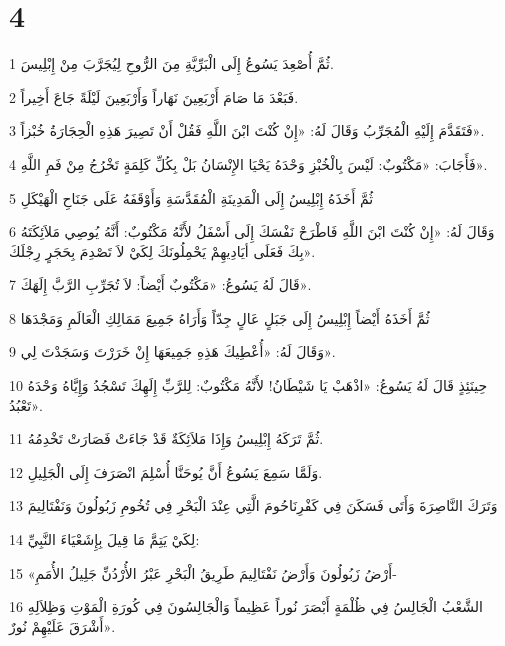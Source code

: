 \chapter{4}

\par 1 ثُمَّ أُصْعِدَ يَسُوعُ إِلَى الْبَرِّيَّةِ مِنَ الرُّوحِ لِيُجَرَّبَ مِنْ إِبْلِيسَ.
\par 2 فَبَعْدَ مَا صَامَ أَرْبَعِينَ نَهَاراً وَأَرْبَعِينَ لَيْلَةً جَاعَ أَخِيراً.
\par 3 فَتَقَدَّمَ إِلَيْهِ الْمُجَرِّبُ وَقَالَ لَهُ: «إِنْ كُنْتَ ابْنَ اللَّهِ فَقُلْ أَنْ تَصِيرَ هَذِهِ الْحِجَارَةُ خُبْزاً».
\par 4 فَأَجَابَ: «مَكْتُوبٌ: لَيْسَ بِالْخُبْزِ وَحْدَهُ يَحْيَا الإِنْسَانُ بَلْ بِكُلِّ كَلِمَةٍ تَخْرُجُ مِنْ فَمِ اللَّهِ».
\par 5 ثُمَّ أَخَذَهُ إِبْلِيسُ إِلَى الْمَدِينَةِ الْمُقَدَّسَةِ وَأَوْقَفَهُ عَلَى جَنَاحِ الْهَيْكَلِ
\par 6 وَقَالَ لَهُ: «إِنْ كُنْتَ ابْنَ اللَّهِ فَاطْرَحْ نَفْسَكَ إِلَى أَسْفَلُ لأَنَّهُ مَكْتُوبٌ: أَنَّهُ يُوصِي مَلاَئِكَتَهُ بِكَ فَعَلَى أيَادِيهِمْ يَحْمِلُونَكَ لِكَيْ لاَ تَصْدِمَ بِحَجَرٍ رِجْلَكَ».
\par 7 قَالَ لَهُ يَسُوعُ: «مَكْتُوبٌ أَيْضاً: لاَ تُجَرِّبِ الرَّبَّ إِلَهَكَ».
\par 8 ثُمَّ أَخَذَهُ أَيْضاً إِبْلِيسُ إِلَى جَبَلٍ عَالٍ جِدّاً وَأَرَاهُ جَمِيعَ مَمَالِكِ الْعَالَمِ وَمَجْدَهَا
\par 9 وَقَالَ لَهُ: «أُعْطِيكَ هَذِهِ جَمِيعَهَا إِنْ خَرَرْتَ وَسَجَدْتَ لِي».
\par 10 حِينَئِذٍ قَالَ لَهُ يَسُوعُ: «اذْهَبْ يَا شَيْطَانُ! لأَنَّهُ مَكْتُوبٌ: لِلرَّبِّ إِلَهِكَ تَسْجُدُ وَإِيَّاهُ وَحْدَهُ تَعْبُدُ».
\par 11 ثُمَّ تَرَكَهُ إِبْلِيسُ وَإِذَا مَلاَئِكَةٌ قَدْ جَاءَتْ فَصَارَتْ تَخْدِمُهُ.
\par 12 وَلَمَّا سَمِعَ يَسُوعُ أَنَّ يُوحَنَّا أُسْلِمَ انْصَرَفَ إِلَى الْجَلِيلِ.
\par 13 وَتَرَكَ النَّاصِرَةَ وَأَتَى فَسَكَنَ فِي كَفْرِنَاحُومَ الَّتِي عِنْدَ الْبَحْرِ فِي تُخُومِ زَبُولُونَ وَنَفْتَالِيمَ
\par 14 لِكَيْ يَتِمَّ مَا قِيلَ بِإِشَعْيَاءَ النَّبِيِّ:
\par 15 «أَرْضُ زَبُولُونَ وَأَرْضُ نَفْتَالِيمَ طَرِيقُ الْبَحْرِ عَبْرُ الأُرْدُنِّ جَلِيلُ الأُمَمِ-
\par 16 الشَّعْبُ الْجَالِسُ فِي ظُلْمَةٍ أَبْصَرَ نُوراً عَظِيماً وَالْجَالِسُونَ فِي كُورَةِ الْمَوْتِ وَظِلاَلِهِ أَشْرَقَ عَلَيْهِمْ نُورٌ».
